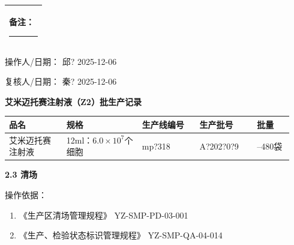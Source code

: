 \documentclass[UTF8,10pt,a4paper,fontset=fandol]{ctexart}
\newcommand{\fieldvalue}[1]{#1}
\newcommand{\handwritten}[1]{#1}
\begin{document}
\vspace{0.3em}

\begin{tabular}{|p{0.90\linewidth}|}
\hline
备注：\rule{10cm}{0.4pt}
\\ \hline
\end{tabular}

\vspace{0.4em}

操作人/日期：
\fieldvalue{\handwritten{邱?}}
\quad
\fieldvalue{\handwritten{2025-12-06}}

\hfill
复核人/日期：
\fieldvalue{\handwritten{秦?}}
\quad
\fieldvalue{\handwritten{2025-12-06}}

\newpage

\begin{center}
\textbf{艾米迈托赛注射液（Z2）批生产记录}
\end{center}

\begin{tabular}{|p{0.19\linewidth}|p{0.25\linewidth}|p{0.19\linewidth}|p{0.19\linewidth}|p{0.12\linewidth}|}
\hline
\centering 品名 & \centering 规格 & \centering 生产线编号 & \centering 生产批号 & \centering 批量 \\
\hline
\centering 艾米迈托赛注射液 &
\centering 12ml：$6.0\times10^7$个细胞 &
\fieldvalue{\handwritten{mp?318}} &
\fieldvalue{\handwritten{A?202?0?9}} &
\centering 200--480袋 \\
\hline
\end{tabular}

\medskip

\textbf{2.3 清场}

\medskip

操作依据：

\begin{enumerate}
  \item 《生产区清场管理规程》 \hfill YZ-SMP-PD-03-001
  \item 《生产、检验状态标识管理规程》 \hfill YZ-SMP-QA-04-014
\end{enumerate}
\end{document}
